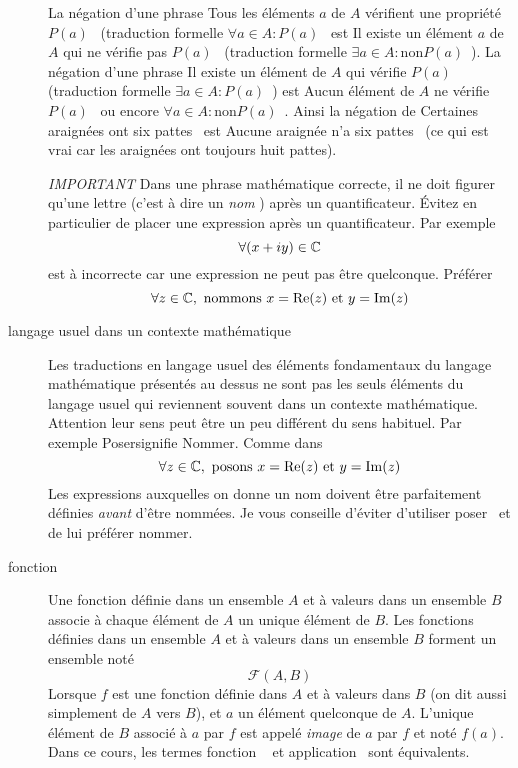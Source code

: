 \begin{description}
\begin{exples}
La négation d'une phrase \og Tous les éléments $a$ de $A$ vérifient une propriété $P(a)$\fg~ (traduction formelle \og $\forall a \in A : P(a)$\fg~ est \og Il existe un élément $a$ de $A$ qui ne vérifie pas $P(a)$\fg~  (traduction formelle \og $\exists a \in A : \mathrm{non}P(a)$\fg~).\newline
La négation d'une phrase \og Il existe un élément de $A$ qui vérifie $P(a)$\fg~ (traduction formelle \og $\exists a \in A : P(a)$\fg~) est \og Aucun élément de $A$ ne vérifie $P(a)$\fg~ ou encore \og $\forall a \in A : \mathrm{non} P(a)$\fg~.\newline
Ainsi la négation de \og Certaines araignées ont six pattes\fg~ est \og Aucune araignée n'a six pattes\fg~ (ce qui est vrai car les araignées ont toujours huit pattes).
\end{exples}
\emph{IMPORTANT} Dans une phrase mathématique correcte, il ne doit figurer qu'une lettre (c'est à dire un \emph{nom} ) après un quantificateur. \'Evitez en particulier de placer une expression après un quantificateur. Par exemple
\begin{displaymath}
 \forall (x+iy) \in \mathbb{C}
\end{displaymath}
est à incorrecte car une expression ne peut pas être quelconque. Préférer
\begin{displaymath}
 \forall z \in \mathbb{C},\text{ nommons } x=\mathop{\mathrm{Re}}(z)\text{ et } y=\mathop{\mathrm{Im}}(z)
\end{displaymath}

\item[langage usuel dans un contexte mathématique]  Les traductions en langage usuel des éléments fondamentaux du langage mathématique présentés au dessus ne sont pas les seuls éléments du langage usuel qui reviennent souvent dans un contexte mathématique. Attention leur sens peut être un peu différent du sens habituel. Par exemple \og Poser\fg signifie \og Nommer\fg. Comme dans 
\begin{displaymath}
\forall z \in \mathbb{C},\text{ posons } x=\mathop{\mathrm{Re}}(z)\text{ et } y=\mathop{\mathrm{Im}}(z)  
\end{displaymath}
Les expressions auxquelles on donne un nom doivent être parfaitement définies \emph{avant} d'être nommées. Je vous conseille d'éviter d'utiliser \og poser\fg~ et de lui préférer \og nommer\fg.


\item[fonction] Une fonction définie dans un ensemble $A$ et à valeurs dans un ensemble $B$ associe à chaque élément de $A$ un unique élément de $B$. Les fonctions définies dans un ensemble $A$ et à valeurs dans un ensemble $B$ forment un ensemble noté
\begin{displaymath}
 \mathcal F (A,B)
\end{displaymath}
Lorsque $f$ est une fonction définie dans $A$ et à valeurs dans $B$ (on dit aussi simplement de $A$ vers $B$), et $a$ un élément quelconque de $A$. L'unique élément de $B$ associé à $a$ par $f$ est appelé \emph{image} de $a$ par $f$ et noté $f(a)$.\newline
Dans ce cours, les termes \og fonction \fg~ et \og application\fg~ sont équivalents.


\end{description}
